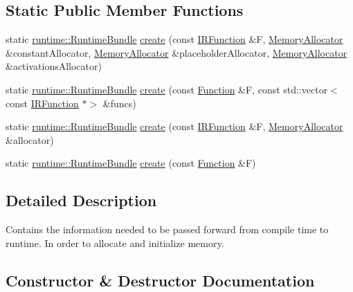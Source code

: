 \subsection*{Static Public Member Functions}
\begin{DoxyCompactItemize}
\item 
static \hyperlink{classglow_1_1runtime_1_1_runtime_bundle}{runtime\+::\+Runtime\+Bundle} \hyperlink{classglow_1_1runtime_1_1_runtime_bundle_a7b230ed6c075c6f0b4b210e17d41c09f}{create} (const \hyperlink{classglow_1_1_i_r_function}{I\+R\+Function} \&F, \hyperlink{classglow_1_1_memory_allocator}{Memory\+Allocator} \&constant\+Allocator, \hyperlink{classglow_1_1_memory_allocator}{Memory\+Allocator} \&placeholder\+Allocator, \hyperlink{classglow_1_1_memory_allocator}{Memory\+Allocator} \&activations\+Allocator)
\item 
static \hyperlink{classglow_1_1runtime_1_1_runtime_bundle}{runtime\+::\+Runtime\+Bundle} \hyperlink{classglow_1_1runtime_1_1_runtime_bundle_afd92718c1299dccfed7f2d667eb3eb69}{create} (const \hyperlink{classglow_1_1_function}{Function} \&F, const std\+::vector$<$ const \hyperlink{classglow_1_1_i_r_function}{I\+R\+Function} $\ast$$>$ \&funcs)
\item 
static \hyperlink{classglow_1_1runtime_1_1_runtime_bundle}{runtime\+::\+Runtime\+Bundle} \hyperlink{classglow_1_1runtime_1_1_runtime_bundle_a8c6efabf1d72088e473646b7b2a3a25a}{create} (const \hyperlink{classglow_1_1_i_r_function}{I\+R\+Function} \&F, \hyperlink{classglow_1_1_memory_allocator}{Memory\+Allocator} \&allocator)
\item 
static \hyperlink{classglow_1_1runtime_1_1_runtime_bundle}{runtime\+::\+Runtime\+Bundle} \hyperlink{classglow_1_1runtime_1_1_runtime_bundle_ab875c4022c4ace24653d5dfb6b55c229}{create} (const \hyperlink{classglow_1_1_function}{Function} \&F)
\end{DoxyCompactItemize}


\subsection{Detailed Description}
Contains the information needed to be passed forward from compile time to runtime. In order to allocate and initialize memory. 

\subsection{Constructor \& Destructor Documentation}
\mbox{\label{classglow_1_1runtime_1_1_runtime_bundle_aa5e7328e332d3c678247ee266fba343f}} 
